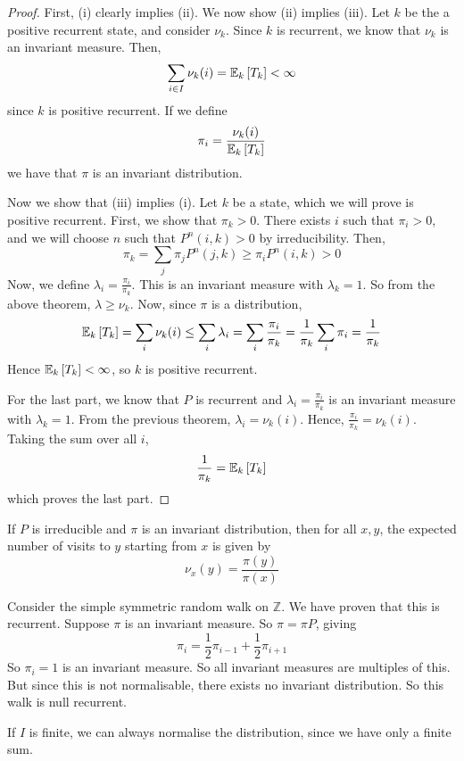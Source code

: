 \begin{proof}
	First, (i) clearly implies (ii).
	We now show (ii) implies (iii).
	Let \( k \) be the a positive recurrent state, and consider \( \nu_k \).
	Since \( k \) is recurrent, we know that \( \nu_k \) is an invariant measure.
	Then,
	\[
		\sum_{i \in I} \nu_k(i) = \mathbb{E}_{k}\left[{T_k}\right] < \infty
	\]
	since \( k \) is positive recurrent.
	If we define
	\[
		\pi_i = \frac{\nu_k(i)}{\mathbb{E}_{k}\left[{T_k}\right]}
	\]
	we have that \( \pi \) is an invariant distribution.

	Now we show that (iii) implies (i).
	Let \( k \) be a state, which we will prove is positive recurrent.
	First, we show that \( \pi_k > 0 \).
	There exists \( i \) such that \( \pi_i > 0 \), and we will choose \( n \) such that \( P^n(i,k) > 0 \) by irreducibility.
	Then,
	\[
		\pi_k = \sum_j \pi_j P^n(j,k) \geq \pi_i P^n(i,k) > 0
	\]
	Now, we define \( \lambda_i = \frac{\pi_i}{\pi_k} \).
	This is an invariant measure with \( \lambda_k = 1 \).
	So from the above theorem, \( \lambda \geq \nu_k \).
	Now, since \( \pi \) is a distribution,
	\[
		\mathbb{E}_{k}\left[{T_k}\right] = \sum_i \nu_k(i) \leq \sum_i \lambda_i = \sum_i \frac{\pi_i}{\pi_k} = \frac{1}{\pi_k} \sum_i \pi_i = \frac{1}{\pi_k}
	\]
	Hence \( \mathbb{E}_{k}\left[{T_k}\right] < \infty \), so \( k \) is positive recurrent.

	For the last part, we know that \( P \) is recurrent and \( \lambda_i = \frac{\pi_i}{\pi_k} \) is an invariant measure with \( \lambda_k = 1 \).
	From the previous theorem, \( \lambda_i = \nu_k(i) \).
	Hence, \( \frac{\pi_i}{\pi_k} = \nu_k(i) \).
	Taking the sum over all \( i \),
	\[
		\frac{1}{\pi_k} = \mathbb{E}_{k}\left[{T_k}\right]
	\]
	which proves the last part.
\end{proof}
\begin{corollary}
	If \( P \) is irreducible and \( \pi \) is an invariant distribution, then for all \( x,y \), the expected number of visits to \( y \) starting from \( x \) is given by
	\[
		\nu_x(y) = \frac{\pi(y)}{\pi(x)}
	\]
\end{corollary}
\begin{example}
	Consider the simple symmetric random walk on \( \mathbb Z \).
	We have proven that this is recurrent.
	Suppose \( \pi \) is an invariant measure.
	So \( \pi = \pi P \), giving
	\[
		\pi_i = \frac{1}{2} \pi_{i-1} + \frac{1}{2} \pi_{i+1}
	\]
	So \( \pi_i = 1 \) is an invariant measure.
	So all invariant measures are multiples of this.
	But since this is not normalisable, there exists no invariant distribution.
	So this walk is null recurrent.
\end{example}
\begin{remark}
	If \( I \) is finite, we can always normalise the distribution, since we have only a finite sum.
\end{remark}
